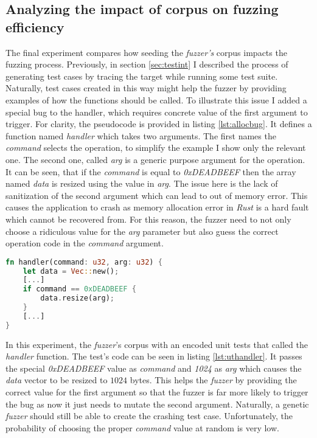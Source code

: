 \subsection{Analyzing the impact of corpus on fuzzing efficiency}
The final experiment compares how seeding the \textit{fuzzer's} corpus impacts the fuzzing process. Previously, in section \ref{sec:testint} I described the process of generating test cases by tracing the target while running some test suite. Naturally, test cases created in this way might help the fuzzer by providing examples of how the functions should be called. To illustrate this issue I added a special bug to the handler, which requires concrete value of the first argument to trigger. For clarity, the pseudocode is provided in listing \ref{lst:allocbug}. It defines a function named \textit{handler} which takes two arguments. The first names the \textit{command} selects the operation, to simplify the example I show only the relevant one. The second one, called \textit{arg} is a generic purpose argument for the operation. It can be seen, that if the \textit{command} is equal to \textit{0xDEADBEEF} then the array named \textit{data} is resized using the value in \textit{arg}. The issue here is the lack of sanitization of the second argument which can lead to out of memory error. This causes the application to crash as memory allocation error in \textit{Rust} is a hard fault which cannot be recovered from. For this reason, the fuzzer need to not only choose a ridiculous value for the \textit{arg} parameter but also guess the correct operation code in the \textit{command} argument.  

\begin{minipage}{\linewidth}
    \begin{lstlisting}[language=rust,caption={The allocation bug pseudocode.},label={lst:allocbug}]
fn handler(command: u32, arg: u32) {
    let data = Vec::new();
    [...]
    if command == 0xDEADBEEF {
        data.resize(arg);
    }
    [...]
}
    \end{lstlisting}
\end{minipage}

In this experiment, the \textit{fuzzer}'s corpus with an encoded unit tests that called the \textit{handler} function. The test's code can be seen in listing \ref{lst:uthandler}. It passes the special \textit{0xDEADBEEF} value as \textit{command} and \textit{1024} as \textit{arg} which causes the \textit{data} vector to be resized to $1024$ bytes. This helps the \textit{fuzzer} by providing the correct value for the first argument so that the fuzzer is far more likely to trigger the bug as now it just needs to mutate the second argument. Naturally, a genetic \textit{fuzzer} should still be able to create the crashing test case. Unfortunately, the probability of choosing the proper \textit{command} value at random is very low. 

